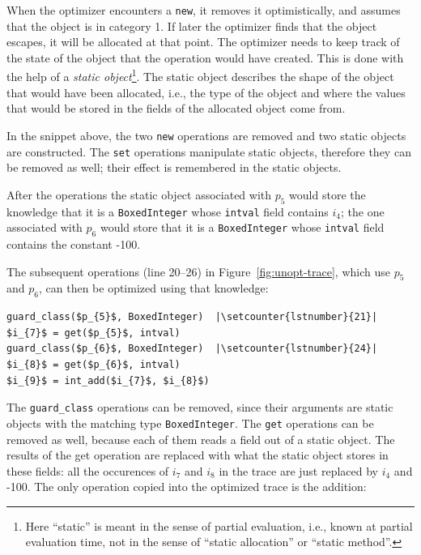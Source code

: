 \documentclass{sigplanconf}
\newcommand\ie{i.e.,\xspace}
\begin{document}
When the optimizer encounters a \lstinline{new}, it removes it optimistically,
and assumes that the object is in category 1. If later the optimizer finds that the object escapes, it
will be allocated at that point. The optimizer needs to keep track
of the state of the object that the operation would have created.
This is done with the help of a \emph{static object}\footnote{Here
``static'' is meant in the sense of partial evaluation, \ie known at partial
evaluation time, not in the sense of ``static allocation'' or ``static
method''.}. The static object describes the shape of the object that would have
been allocated, \ie the type of the object and where the values that would be
stored in the fields of the allocated object come from.

In the snippet above, the two \lstinline{new} operations are removed and two
static objects are constructed. The \lstinline{set} operations manipulate
static objects, therefore they can be removed as well; their effect is
remembered in the static objects.

After the operations the static object associated with $p_{5}$ would store the knowledge that it is a
\lstinline{BoxedInteger} whose \lstinline{intval} field contains $i_{4}$; the
one associated with $p_{6}$ would store that it is a \lstinline{BoxedInteger}
whose \lstinline{intval} field contains the constant -100.

The subsequent operations (line 20--26) in Figure~\ref{fig:unopt-trace}, which
use $p_{5}$ and $p_{6}$, can then be optimized using that knowledge:

\begin{lstlisting}[mathescape,xleftmargin=20pt,numbers=right,escapechar=|, firstnumber=20,basicstyle=\setstretch{1.1}\ttfamily\scriptsize]
guard_class($p_{5}$, BoxedInteger)  |\setcounter{lstnumber}{21}|
$i_{7}$ = get($p_{5}$, intval)
guard_class($p_{6}$, BoxedInteger)  |\setcounter{lstnumber}{24}|
$i_{8}$ = get($p_{6}$, intval)
$i_{9}$ = int_add($i_{7}$, $i_{8}$)
\end{lstlisting}

The \lstinline{guard_class} operations can be removed, since their arguments are
static objects with the matching type \lstinline{BoxedInteger}. The
\lstinline{get} operations can be removed as well, because each of them reads a
field out of a static object. The results of the get operation are replaced with
what the static object stores in these fields: all the occurences of $i_{7}$ and $i_{8}$ in the trace are just
replaced by $i_{4}$ and -100. The only operation copied into the optimized trace
is the addition:
\end{document}
